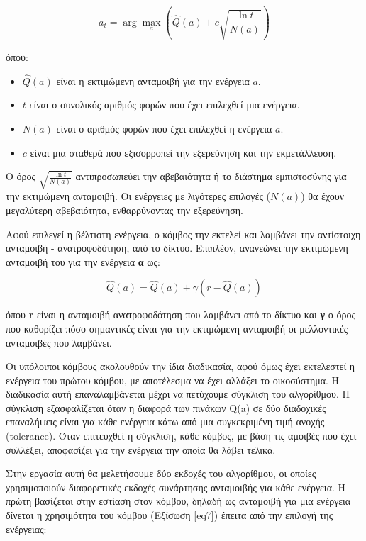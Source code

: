 \begin{equation}
    a_t = \arg \max_a \left( \hat{Q}(a) + c \sqrt{\frac{\ln t}{N(a)}} \right)
    \label{eq16}
\end{equation}

όπου:

\begin{itemize}
  \item $\hat{Q}(a)$ είναι η εκτιμώμενη ανταμοιβή για την ενέργεια $a$.
  \item $t$ είναι ο συνολικός αριθμός φορών που έχει επιλεχθεί μια ενέργεια.
  \item $N(a)$ είναι ο αριθμός φορών που έχει επιλεχθεί η ενέργεια $a$.
  \item $c$ είναι μια σταθερά που εξισορροπεί την εξερεύνηση και την εκμετάλλευση.
\end{itemize}

Ο όρος \(\sqrt{\frac{\ln t}{N(a)}}\) αντιπροσωπεύει την αβεβαιότητα ή το διάστημα εμπιστοσύνης για την εκτιμώμενη ανταμοιβή. Οι ενέργειες με λιγότερες επιλογές ($N(a)$) θα έχουν μεγαλύτερη αβεβαιότητα, ενθαρρύνοντας την εξερεύνηση.

Αφού επιλεγεί η βέλτιστη ενέργεια, ο κόμβος την εκτελεί και λαμβάνει την αντίστοιχη ανταμοιβή - ανατροφοδότηση, από το δίκτυο. Επιπλέον, ανανεώνει την εκτιμώμενη ανταμοιβή του για την ενέργεια \textbf{α} ως:

\begin{equation}
    \hat{Q}(a) = \hat{Q}(a) + \gamma (r - \hat{Q}(a))
    \label{eq17}
\end{equation}

\noindent
όπου \textbf{r} είναι η ανταμοιβή-ανατροφοδότηση που λαμβάνει από το δίκτυο και \textbf{γ} ο όρος που καθορίζει πόσο σημαντικές είναι για την εκτιμώμενη ανταμοιβή οι μελλοντικές ανταμοιβές που λαμβάνει.

Οι υπόλοιποι κόμβους ακολουθούν την ίδια διαδικασία, αφού όμως έχει εκτελεστεί η ενέργεια του πρώτου κόμβου, με αποτέλεσμα να έχει αλλάξει το οικοσύστημα. Η διαδικασία αυτή επαναλαμβάνεται μέχρι να πετύχουμε σύγκλιση του αλγορίθμου. Η σύγκλιση εξασφαλίζεται όταν η διαφορά των πινάκων Q(a) σε δύο διαδοχικές επαναλήψεις είναι για κάθε ενέργεια κάτω από μια συγκεκριμένη τιμή ανοχής (tolerance). Όταν επιτευχθεί η σύγκλιση, κάθε κόμβος, με βάση τις αμοιβές που έχει συλλέξει, αποφασίζει για την ενέργεια την οποία θα λάβει τελικά.

Στην εργασία αυτή θα μελετήσουμε δύο εκδοχές του αλγορίθμου, οι οποίες χρησιμοποιούν διαφορετικές εκδοχές συνάρτησης ανταμοιβής για κάθε ενέργεια. Η πρώτη βασίζεται στην εστίαση στον κόμβου, δηλαδή ως ανταμοιβή για μια ενέργεια δίνεται η χρησιμότητα του κόμβου (Εξίσωση \ref{eq7}) έπειτα από την επιλογή της ενέργειας:

